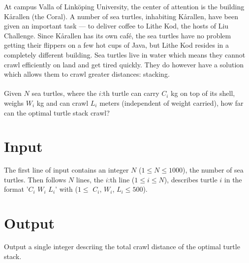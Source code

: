 At campus Valla of Linköping University, the center of attention is the building Kårallen (the Coral). A number of sea turtles, inhabiting Kårallen, have been given an important task --- to deliver coffee to Lithe Kod, the hosts of Liu Challenge. Since Kårallen has its own café, the sea turtles have no problem getting their flippers on a few hot cups of Java, but Lithe Kod resides in a completely different building. Sea turtles live in water which means they cannot crawl efficiently on land and get tired quickly. They do however have a solution which allows them to crawl greater distances: stacking.\\
\\
Given $N$ sea turtles, where the $i$:th turtle can carry $C_i$ kg on top of its shell, weighs $W_i$ kg and can crawl $L_i$ meters (independent of weight carried), how far can the optimal turtle stack crawl?\\

\section*{Input}
The first line of input contains an integer $N$ ($1 \leq N \leq 1000$), the number of sea turtles. Then follows $N$ lines, the $i$:th line ($1 \leq i \leq N$), describes turtle $i$ in the format '$C_i$ $W_i$ $L_i$' with ($1 \leq$ $C_i$, $W_i$, $L_i \leq 500$).

\section*{Output}
Output a single integer descriing the total crawl distance of the optimal turtle stack.
